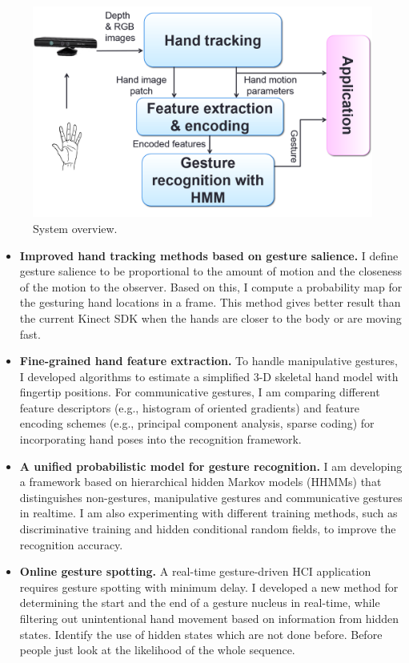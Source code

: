 \begin{figure}[tbh]
\centering
\includegraphics[width=0.7\linewidth]{figures/system_overview.png}
\caption{System overview.}
\label{fig:overview}
\end{figure}

\begin{itemize}
  \item \textbf{Improved hand tracking methods based on gesture salience.}
  I define gesture salience to be proportional to the amount of motion and the
  closeness of the motion to the observer. Based on this, I compute a
  probability map for the gesturing hand locations in a frame. This method
  gives better result than the current Kinect SDK when the hands are closer to
  the body or are moving fast.

  \item \textbf{Fine-grained hand feature extraction.} To handle manipulative
  gestures, I developed algorithms to estimate a simplified 3-D
  skeletal hand model with fingertip positions. For communicative gestures, I am
  comparing different feature descriptors (e.g., histogram of oriented
  gradients) and feature encoding schemes (e.g., principal component analysis,
  sparse coding) for incorporating hand poses into the recognition framework.

  \item \textbf{A unified probabilistic model for gesture recognition.} I am
  developing a framework based on hierarchical hidden Markov
  models (HHMMs) that distinguishes non-gestures, 
  manipulative gestures and communicative gestures in realtime. I am also experimenting with different
  training methods, such as discriminative training and hidden conditional
  random fields, to improve the recognition accuracy. 

  \item \textbf{Online gesture spotting.} A real-time gesture-driven HCI
  application requires gesture spotting with minimum delay. I developed a new
  method for determining the start and the end of a gesture nucleus in
  real-time, while filtering out unintentional hand movement based on
  information from hidden states. Identify the use of hidden states which are
  not done before. Before people just look at the likelihood of the whole
  sequence.
  

\end{itemize}
